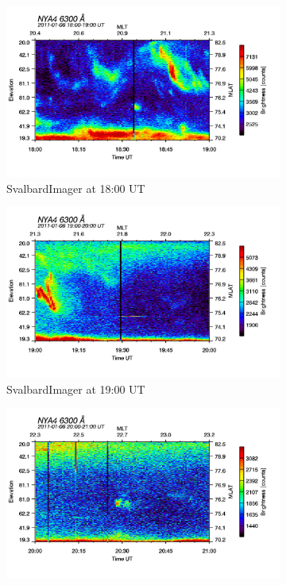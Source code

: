 \documentclass[10pt,a4paper]{article}
\begin{document}
\begin{figure}[h]
\centering
\begin{subfigure}{0.3\textwidth}
\centering
	\includegraphics[width=\textwidth]{SvalbardImager6300A18.png}
	\caption{ SvalbardImager at 18:00 UT \label{SBI_6_18}}
\end{subfigure}
\begin{subfigure}{0.3\textwidth}
\centering
	\includegraphics[width=\textwidth]{SvalbardImager6300A19.png}
	\caption{ SvalbardImager at 19:00 UT \label{SBI_6_19}}
\end{subfigure}
\begin{subfigure}{0.3\textwidth}
\centering
	\includegraphics[width=\textwidth]{SvalbardImager6300A20.png}

\end{subfigure}
\end{figure}
\end{document}
